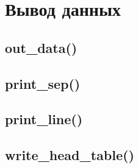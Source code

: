 \documentclass[12pt, a4paper]{article}
\begin{document}



\section{Вывод данных}


\subsection{out\_data()}






\subsection{print\_sep()}






\subsection{print\_line()}






\subsection{write\_head\_table()}


\end{document}
